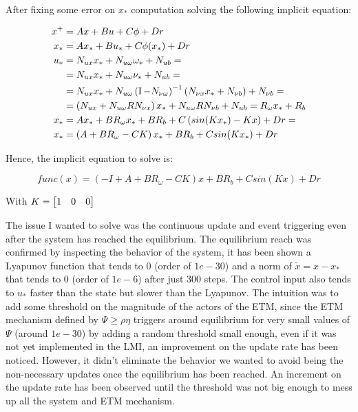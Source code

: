 \documentclass{article}
\begin{document}
After fixing some error on $x_{*}$ computation solving the following implicit equation:

\begin{align*}
  x^{+} &= A x + B u + C \phi + D r\\
  x_{*} &= A x_{*} + B u_{*} + C \phi(x_{*}) + D r \\
  u_{*} &= N_{ux} x_{*} + N_{u \omega} \omega_{*} + N_{ub} = \\
  &= N_{ux} x_{*} + N_{u \omega} \nu_{*} + N_{ub} = \\
  &= N_{ux} x_{*} + N_{u \omega} \left( \operatorname{I} - N_{\nu \omega} \right) ^{-1} \left(  N_{\nu x} x_{*} + N_{\nu b}\right) + N_{\nu b} = \\
  &= \left( N_{ux} + N_{u \omega} R N_{\nu x} \right) x_{*} + N_{u \omega} R N_{\nu b} + N_{ub} = R_{\omega} x_{*} + R_{b}\\
  x_{*} &= A x_{*} + B R_{\omega} x_{*} + B R_{b} + C \left( sin(K x_{*}) - K x \right) + D r = \\
  x_{*} &= \left( A + B R_{\omega} - C K \right) x_{*} + B R_{b} + C sin(K x_{*}) + D r
\end{align*}

Hence, the implicit equation to solve is:

\begin{equation}
  \textit{func}(x) = (-I + A + B R_{\omega} - C K) x + B R_{b} + C sin(K x) + D r 
\end{equation}

With $K = \left[\begin{matrix}1 & 0 & 0\end{matrix}\right]$
 
The issue I wanted to solve was the continuous update and event triggering even after the system has reached the equilibrium. The equilibrium reach was confirmed by inspecting the behavior of the system, it has been shown a Lyapunov function that tends to 0 (order of $1e-30$) and a norm of $\tilde{x} = x - x_{*}$ that tends to 0 (order of $1e-6$) after just 300 steps. The control input also tends to $u_{*}$ faster than the state but slower than the Lyapunov.
The intuition was to add some threshold on the magnitude of the actors of the ETM, since the ETM mechanism defined by $
  \Psi \geq \rho \eta $ triggers around equilibrium for very small values of $\Psi$ (around $1e-30$) by adding a random threshold small enough, even if it was not yet implemented in the LMI, an improvement on the update rate has been noticed. However, it didn't eliminate the behavior we wanted to avoid being the non-necessary updates once the equilibrium has been reached. An increment on the update rate has been observed until the threshold was not big enough to mess up all the system and ETM mechanism.
\end{document}
